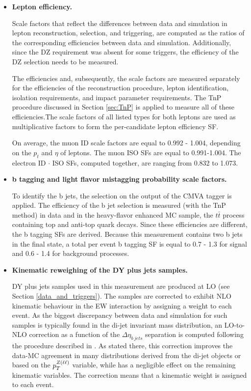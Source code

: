 \begin{itemize}

\item{\bfseries Lepton efficiency.} 

Scale factors that reflect the differences between data and simulation in lepton 
reconstruction, selection, and triggering, are computed as the ratios of the corresponding
efficiencies between data and simulation. Additionally, since the DZ requirement was absent for some triggers, the efficiency of the DZ selection needs to be measured. 

The efficiencies and, subsequently, the scale factors are measured separately for the efficiencies of the reconstruction procedure, lepton identification, isolation requirements, and impact parameter requirements. The TnP procedure discussed in Section \ref{sec:TnP} is applied to measure all of these efficiencies.The scale factors of all listed types for both leptons are used as multiplicative factors
to form the per-candidate lepton efficiency SF.

On average, the muon ID scale factors are equal to 0.992 - 1.004, depending on the $p_t$ and $\eta$ of leptons. The muon ISO SFs are equal to 0.991-1.004. The electron ID $\cdot$ ISO SFs, computed together, are ranging from 0.832 to 1.073.

\item{\bfseries b tagging and light flavor mistagging probability scale factors.} 

To identify the b jets, the selection on the output of the CMVA tagger is applied. The efficiency of the b jet selection is measured (with the TnP method) in data and in the heavy-flavor enhanced MC sample, the $t\bar{t}$ process containing top and anti-top quark decays. Since these efficiencies are different, the b tagging SFs are derived. Because this measurement contains two b jets in the final state, a total per event b tagging SF is equal to 0.7 - 1.3 for signal and 0.6 - 1.4 for background processes. 

\item{\bfseries Kinematic reweighing of the DY plus jets samples.} 

DY plus jets samples used in this measurement are produced at LO (see Section \ref{data_and_triggers}). The samples are corrected to exhibit NLO kinematic behaviour in the EW interaction by assigning a weight to each event. As the biggest discrepancy between data and simulation for such samples is typically found in the di-jet invariant mass distribution, an LO-to-NLO correction as a function of the $\Delta \eta_{b\ jets}$ separation is computed following the procedure described in \cite{DYLOtoNLO}. As stated there, this correction improves the data-MC agreement in many distributions derived from the di-jet objects or based on the $p_T^{Z(\ell\ell)}$ variable, while has a negligible effect on the remaining kinematic variables. The correction means that a kinematic weight is assigned to each event.


\end{itemize}

